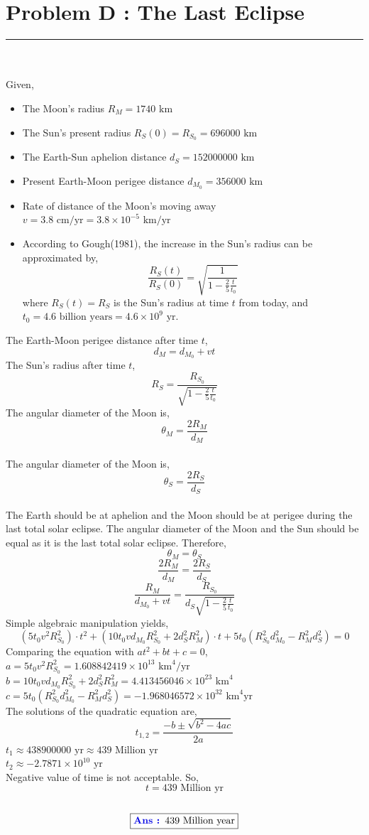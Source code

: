 \documentclass{article}
\begin{document}
\section*{Problem D : The Last Eclipse}
\vspace{-10pt} \textcolor{cyan}{\rule{7.6cm}{0.6pt}}\\\\
Given,
\begin{itemize}
    \item The Moon's radius $R_M=1740\text{ km}$
    \item The Sun's present radius $R_S(0)=R_{S_0}=696000\text{ km}$ 
    \item The Earth-Sun aphelion distance $d_S=152000000\text{ km}$
    \item Present Earth-Moon perigee distance $d_{M_0}=356000\text{ km}$
    \item Rate of distance of the Moon's moving away $v=3.8\text{ cm/yr}=3.8\times10^{-5}\text{ km/yr}$
    \item According to Gough(1981), the increase in the Sun’s radius can be approximated by,
    \[\frac{R_S(t)}{R_S(0)}=\sqrt{\frac{1}{1-\frac{2}{5}\frac{t}{t_0}}}\]
    where $R_{S} (t)=R_{S}$ is the Sun’s radius at time $t$ from today, and\\ $t_0=4.6 \text{ billion years}=4.6\times10^9\text{ yr}$.\\
\end{itemize}
The Earth-Moon perigee distance after time $t$,
\[d_M=d_{M_0}+vt\]
The Sun’s radius after time $t$,
\[R_S=\frac{R_{S_0}}{\sqrt{1-\frac{2}{5}\frac{t}{t_0}}}\]
The angular diameter of the Moon is,
$$\theta_M=\frac{2R_M}{d_M}$$\\
The angular diameter of the Moon is,
$$\theta_S=\frac{2R_S}{d_S}$$\\
The Earth should be at aphelion and the Moon should be at perigee during the last total solar eclipse. The angular diameter of the Moon and the Sun should be equal as it is the last total solar eclipse. 
\newpage
Therefore,
\[\theta_M= \theta_S\]
\[\frac{2R_M}{d_M}=\frac{2R_S}{d_S}\]
\[\frac{R_M}{d_{M_0}+vt}=\frac{R_{S_0}}{d_S\sqrt{1-\frac{2}{5}\frac{t}{t_0}}}\]
Simple algebraic manipulation yields,
\[(5t_0v^2R_{S_0}^2)\cdot t^2 + (10t_0v d_{M_0}R_{S_0}^2+2d_S^2R_M^2)\cdot t + 5t_0(R_{S_0}^2d_{M_0}^2-R_M^2d_S^2)=0\]
Comparing the equation with $at^2+bt+c=0$, \\
$a=5t_0v^2R_{S_0}^2=1.608842419\times10^{13} \text{ km}^4/\text{yr}$\\
$b=10t_0v d_{M_0}R_{S_0}^2+2d_S^2R_M^2=4.413456046\times10^{23}\text{ km}^4 $\\
$c=5t_0(R_{S_0}^2d_{M_0}^2-R_M^2d_S^2)=-1.968046572\times10^{32}\text{ km}^4\text{yr}$\\
The solutions of the quadratic equation are,
\[t_{1,2}=\frac{-b±\sqrt{b^2-4ac}}{2a}\]
$t_1\approx438900000\text{ yr}\approx 439 \text{ Million yr}$\\
$t_2\approx-2.7871\times10^{10}\text{ yr}$\\
Negative value of time is not acceptable. So,
\[t=439 \text{ Million yr}\]\\
\[
\boxed{\textcolor{blue!90!black}{\textbf{Ans : }} 439 \text{ Million year}}
\] \\
\end{document}
